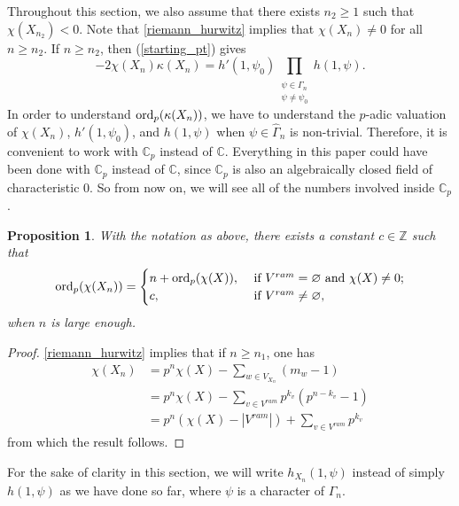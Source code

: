 \documentclass[11pt]{amsart}
\newtheorem{proposition}[theorem]{Proposition}
\numberwithin{equation}{section}
\theoremstyle{remark}
\theoremstyle{definition}
\begin{document}
Throughout this section, we also assume that there exists $n_{2} \ge 1$ such that $\chi(X_{n_{2}}) < 0$.  Note that \cref{riemann_hurwitz} implies that $\chi(X_{n}) \neq 0$ for all $n \ge n_{2}$.  If $n \ge n_{2}$, then (\ref{starting_pt}) gives
\begin{equation} \label{starting_pt1}
-2 \chi(X_{n}) \kappa(X_{n}) = h'(1,\psi_{0})\prod_{\substack{\psi \in \widehat{\Gamma}_{n} \\ \psi \neq \psi_{0}}} h(1,\psi).
\end{equation}
In order to understand ${\rm ord}_{p}(\kappa(X_{n}))$, we have to understand the $p$-adic valuation of $\chi(X_{n})$, $h'(1,\psi_{0})$, and $h(1,\psi)$ when $\psi \in \widehat{\Gamma}_{n}$ is non-trivial.  Therefore, it is convenient to work with $\mathbb{C}_{p}$ instead of $\mathbb{C}$.  Everything in this paper could have been done with $\mathbb{C}_{p}$ instead of $\mathbb{C}$, since $\mathbb{C}_{p}$ is also an algebraically closed field of characteristic $0$.  So from now on, we will see all of the numbers involved inside $\mathbb{C}_{p}$.  
\begin{proposition} \label{ec_i}
With the notation as above, there exists a constant $c \in \mathbb{Z}$ such that
\begin{equation*}
{\rm ord}_{p}(\chi(X_{n})) =
\begin{cases}
n + {\rm ord}_{p}(\chi(X)), &\text{ if } V^{ram} = \varnothing \text{ and } \chi(X) \neq 0; \\
c, &\text{ if } V^{ram} \neq \varnothing,
\end{cases}
\end{equation*}
when $n$ is large enough.
\end{proposition}
\begin{proof}
\cref{riemann_hurwitz} implies that if $n \ge n_{1}$, one has
\begin{equation*}
\begin{aligned}
\chi(X_{n}) &= p^{n}\chi(X) - \sum_{w \in V_{X_{n}}}(m_{w}-1) \\
&= p^{n}\chi(X) - \sum_{v \in V^{ram}}p^{k_{v}}(p^{n-k_{v}}-1) \\
&= p^{n}(\chi(X) - |V^{ram}|) + \sum_{v \in V^{ram}} p^{k_{v}}
\end{aligned}
\end{equation*}
from which the result follows.
\end{proof}
For the sake of clarity in this section, we will write $h_{X_{n}}(1,\psi)$ instead of simply $h(1,\psi)$ as we have done so far, where $\psi$ is a character of $\Gamma_{n}$.
\end{document}
